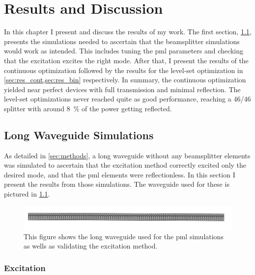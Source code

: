 \chapter{Results and Discussion}

In this chapter I present and discuss the results of my work.
The first section, \cref{sec:long_waveguide}, presents the simulations needed to
ascertain that the beamsplitter simulations would work as intended.
This includes tuning the \gls{pml} parameters and checking that the excitation
excites the right mode.
After that, I present the results of the continuous optimization followed by the
results for the level-set optimization in \cref{sec:res_cont,sec:res_bin}
respectively.
In summary, the continuous optimization yielded near perfect devices with full
transmission and minimal reflection.
The level-set optimizations never reached quite as good performance, reaching a
46/46 splitter with around 8~\% of the power getting reflected.

\section{Long Waveguide Simulations}\label{sec:long_waveguide}

As detailed in \cref{sec:methods}, a long waveguide without any beamsplitter
elements was simulated to ascertain that the excitation method correctly excited
only the desired mode, and that the \gls{pml} elements were reflectionless.
In this section I present the results from those simulations.
The waveguide used for these is pictured in \cref{fig:long_waveguide}.

\begin{figure}[htpb]
	\centering
	\includegraphics[width=\textwidth]{chapters/results/long_waveguide_geom.png}
	\caption{%
		This figure shows the long waveguide used for the \gls{pml} simulations
		as wells as validating the excitation method.
	}%
	\label{fig:long_waveguide}
\end{figure}

\subsection{Excitation}


